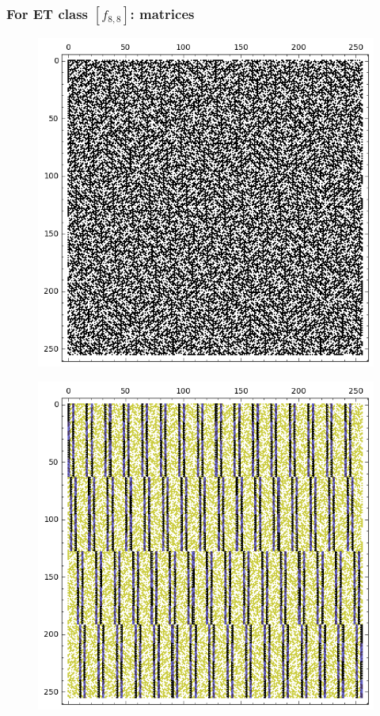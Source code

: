 \documentclass[pdf,sprung,slideColor,nocolorBG]{beamer}
\begin{document}
\begin{frame}
\frametitle{For ET class $[f_{8,8}]$: matrices}
\begin{figure}
\centering
\begin{minipage}{.48\textwidth}
  \centering
  \includegraphics[width=.9\linewidth]{../matrix_plot/c8_8_weight_class_matrix.png}
  \label{fig:8_8_weight_class_matrix}
\end{minipage}%
\begin{minipage}{.48\textwidth}
  \centering
  \includegraphics[width=.9\linewidth]{../matrix_plot/c8_8_bent_cayley_graph_index_matrix.png}
  \label{fig:8_8_bent_cayley_graph_index_matrix}
\end{minipage}
\end{figure}
\end{frame}
\end{document}
